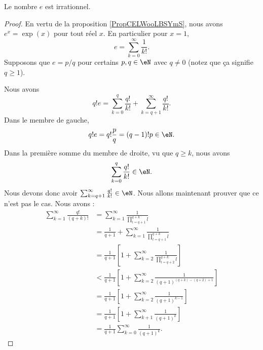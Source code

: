 \begin{proposition}     \label{PROPooFRKUooZyhHIC}
    Le nombre \( e\) est irrationnel.
\end{proposition}

\begin{proof}
    En vertu de la proposition \ref{PropCELWooLBSYmS}, nous avons \( e^x=\exp(x)\) pour tout réel \( x\). En particulier pour \( x=1\),
    \begin{equation}
        e=\sum_{k=0}^{\infty}\frac{1}{ k! }.
    \end{equation}
    Supposons que \( e=p/q\) pour certains \( p,q\in \eN\) avec \( q\neq 0\) (notez que ça signifie \( q\geq 1\)).

    Nous avons
    \begin{equation}
        q!e=\sum_{k=0}^q\frac{ q! }{ k! }+\sum_{k=q+1}^{\infty}\frac{ q! }{ k! }.
    \end{equation}
    Dans le membre de gauche, 
    \begin{equation}
        q!e=q!\frac{ p }{ q }=(q-1)!p\in \eN.
    \end{equation}
    Dans la première somme du membre de droite, vu que \( q\geq k\), nous avons
    \begin{equation}
        \sum_{k=0}^q\frac{ q! }{ k! }\in \eN.
    \end{equation}
    Nous devons donc avoir \( \sum_{k=q+1}^{\infty}\frac{ q! }{ k! }\in \eN\). Nous allons maintenant prouver que ce n'est pas le cas. Nous avons :
    \begin{subequations}
        \begin{align}
            \sum_{k=1}^{\infty}\frac{ q! }{ (q+k)! }&=\sum_{k=1}^{\infty}\frac{1}{ \prod_{l=q+1}^{q+k}l }\\
            &=\frac{1}{ q+1 }+\sum_{k=1}^{\infty}\frac{1}{ \prod_{l=q+1}^{q+k}l }\\
        &=\frac{1}{ q+1 }\left[ 1+\sum_{k=2}^{\infty}\frac{1}{ \prod_{l=q+2}^{q+k}l } \right]\\
    &<\frac{1}{ q+1 }\left[ 1+\sum_{k=2}^{\infty}\frac{1}{ (q+1)^{(q+k)-(q+2)+1} } \right]\\
&=\frac{1}{ q+1 }\left[ 1+\sum_{k=2}^{\infty}\frac{1}{ (q+1)^{k-1} } \right]\\
&=\frac{1}{ q+1 }\left[ 1+\sum_{k+1}^{\infty}\frac{1}{ (q+1)^k } \right]\\
&=\frac{1}{ q+1 }\sum_{k=0}^{\infty}\frac{1}{ (q+1)^k }.
        \end{align}
    \end{subequations}

\end{proof}
